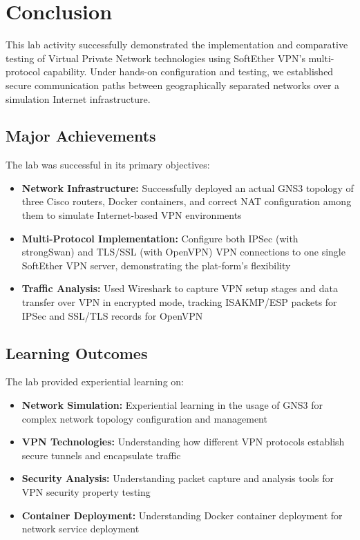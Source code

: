 \newpage

\section{Conclusion}

This lab activity successfully demonstrated the implementation and comparative testing of Virtual Private Network technologies using SoftEther VPN's multi-protocol capability. Under hands-on configuration and testing, we established secure communication paths between geographically separated networks over a simulation Internet infrastructure.

\subsection{Major Achievements}

The lab was successful in its primary objectives:

\begin{itemize}
    \item \textbf{Network Infrastructure:} Successfully deployed an actual GNS3 topology of three Cisco routers, Docker containers, and correct NAT configuration among them to simulate Internet-based VPN environments
    
    \item \textbf{Multi-Protocol Implementation:} Configure both IPSec (with strongSwan) and TLS/SSL (with OpenVPN) VPN connections to one single SoftEther VPN server, demonstrating the plat-form's flexibility
    
    \item \textbf{Traffic Analysis:} Used Wireshark to capture VPN setup stages and data transfer over VPN in encrypted mode, tracking ISAKMP/ESP packets for IPSec and SSL/TLS records for OpenVPN
\end{itemize}

\subsection{Learning Outcomes}

The lab provided experiential learning on:

\begin{itemize}
    \item \textbf{Network Simulation:} Experiential learning in the usage of GNS3 for complex network topology configuration and management
    
    \item \textbf{VPN Technologies:}  Understanding how different VPN protocols establish secure tunnels and encapsulate traffic

    \item \textbf{Security Analysis:} Understanding packet capture and analysis tools for VPN security property testing
    
    \item \textbf{Container Deployment:} Understanding Docker container deployment for network service deployment

\end{itemize}


